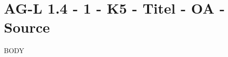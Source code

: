 \section{AG-L 1.4 - 1 - K5 - Titel - OA - Source}

\begin{beispiel}[AG-L 1.4]{1}
BODY
\end{beispiel}